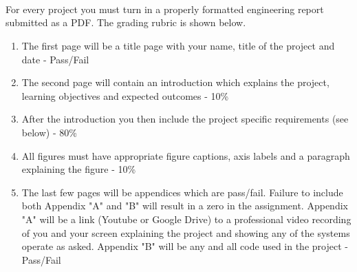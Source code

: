 \ \\
\ \\
\ \\
\noindent For every project you must turn in a properly formatted engineering report submitted as a PDF. The grading rubric is shown below.

\begin{enumerate}[itemsep=-5pt]
\item The first page will be a title page with your name, title of the project and date - Pass/Fail 	
\item The second page will contain an introduction which explains the project, learning objectives and expected outcomes - 10\%
\item After the introduction you then include the project specific requirements (see below) - 80\%
\item All figures must have appropriate figure captions, axis labels and a paragraph explaining the figure - 10\%
\item The last few pages will be appendices which are pass/fail. Failure to include both Appendix "A" and "B" will result in a zero in the assignment. Appendix "A" will be a link (Youtube or Google Drive) to a professional video recording of you and your screen explaining the project and showing any of the systems operate as asked. Appendix "B" will be any and all code used in the project - Pass/Fail
\end{enumerate}

